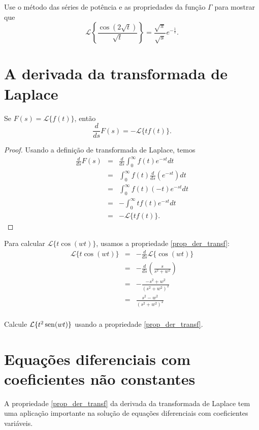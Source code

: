 \documentclass[Main.tex]{subfiles}
\begin{document}
\begin{prob}Use o método das séries de potência e as propriedades da função $\Gamma$ para mostrar que
$$
\mathcal{L}\left\{\frac{\cos(2\sqrt{t})}{\sqrt{t}}\right\}=\frac{\sqrt{\pi}}{\sqrt{s}}e^{-\frac{1}{s}}.
$$
\end{prob}

\section{A derivada da transformada de Laplace}
\begin{propr}{\label{prop_der_transf}}
Se $F(s)=\mathcal{L}\{f(t)\}$, então
\begin{equation}
\frac{d}{ds}F(s)=-\mathcal{L}\{tf(t)\}.
\end{equation} 
\end{propr}
\begin{proof}
Usando a definição de transformada de Laplace, temos
\begin{eqnarray*}
\frac{d}{ds}F(s)&=&\frac{d}{ds}\int_0^\infty f(t) e^{-st}dt\\
&=&\int_0^\infty f(t) \frac{d}{ds}\left(e^{-st}\right)dt\\
&=&\int_0^\infty f(t) (-t)e^{-st}dt\\
&=&-\int_0^\infty tf(t) e^{-st}dt\\
&=&-\mathcal{L}\{tf(t)\}.
\end{eqnarray*}
\end{proof}

\begin{ex}Para calcular $\mathcal{L}\{t\cos(wt)\}$, usamos a propriedade \ref{prop_der_transf}:
\begin{eqnarray*}
\mathcal{L}\{t\cos(wt)\}&=&-\frac{d}{ds}\mathcal{L}\{\cos(wt)\}\\
&=&-\frac{d}{ds}\left(\frac{s}{s^2+w^2}\right)\\
&=&-\frac{-s^2+w^2}{(s^2+w^2)^2}\\
&=&\frac{s^2-w^2}{(s^2+w^2)^2}\\
\end{eqnarray*}
\end{ex}
\begin{prob}Calcule $\mathcal{L}\{t^2\operatorname{sen}(wt)\}$ usando a propriedade \ref{prop_der_transf}.
\end{prob}


\section{Equações diferenciais com coeficientes não constantes}
A propriedade \ref{prop_der_transf} da derivada da transformada de Laplace tem uma aplicação importante na solução de equações diferenciais com coeficientes variáveis.
\end{document}
